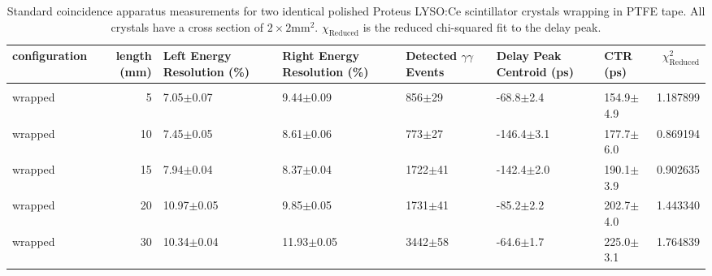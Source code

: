 \begin{table}
\caption{\label{tab:standardctr} Standard coincidence apparatus measurements for two identical polished Proteus LYSO:Ce scintillator crystals wrapping in PTFE tape. All crystals have a cross section of $2\times2$mm$^2$. $\chi_\text{Reduced}$ is the reduced chi-squared fit to the delay peak.}
\begin{tabular}{lrlllllr}
configuration &  length (mm) & Left Energy Resolution (\%) & Right Energy Resolution (\%) & Detected $\gamma\gamma$ Events & Delay Peak Centroid (ps) & CTR (ps) &  $\chi^2_\text{Reduced}$ \\
\hline
              &         &                      &                  &              &                 &                &             \\
      wrapped &       5 &        7.05$\pm$0.07 &    9.44$\pm$0.09 &   856$\pm$29 &   -68.8$\pm$2.4 &  154.9$\pm$4.9 &    1.187899 \\
      wrapped &      10 &        7.45$\pm$0.05 &    8.61$\pm$0.06 &   773$\pm$27 &  -146.4$\pm$3.1 &  177.7$\pm$6.0 &    0.869194 \\
      wrapped &      15 &        7.94$\pm$0.04 &    8.37$\pm$0.04 &  1722$\pm$41 &  -142.4$\pm$2.0 &  190.1$\pm$3.9 &    0.902635 \\
      wrapped &      20 &       10.97$\pm$0.05 &    9.85$\pm$0.05 &  1731$\pm$41 &   -85.2$\pm$2.2 &  202.7$\pm$4.0 &    1.443340 \\
      wrapped &      30 &       10.34$\pm$0.04 &   11.93$\pm$0.05 &  3442$\pm$58 &   -64.6$\pm$1.7 &  225.0$\pm$3.1 &    1.764839 \\
\hline
\end{tabular}
\end{table}
